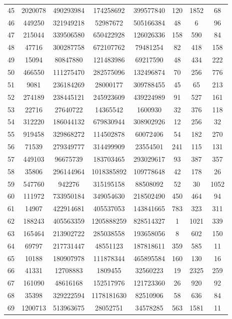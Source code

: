 \documentclass[11pt]{article}
\begin{document}
\begin{table}[h!]
\begin{tabular}{p{1cm}|C| C | C | C | C | C | C}
45 & 2020078 & 490293984 & 174258692 & 399577840 & 120 & 1852 & 68 \\ 
46 & 449250 & 321949218 & 52987672 & 505166384 & 48 & 6 & 96 \\ 
47 & 215044 & 339506580 & 650422928 & 126026336 & 158 & 590 & 84 \\ 
48 & 47716 & 300287758 & 672107762 & 79481254 & 82 & 418 & 158 \\ 
49 & 15094 & 80847880 & 121483986 & 69217590 & 48 & 434 & 222 \\ 
50 & 466550 & 111275470 & 282575096 & 132496874 & 70 & 256 & 776 \\ 
51 & 9081 & 236184269 & 28000177 & 309788455 & 45 & 65 & 213 \\ 
52 & 274189 & 238445121 & 245923609 & 439224989 & 91 & 527 & 161 \\ 
53 & 22716 & 27640722 & 14365542 & 1600930 & 32 & 376 & 118 \\ 
54 & 312220 & 186044132 & 679830944 & 308902926 & 12 & 256 & 32 \\ 
55 & 919458 & 329868272 & 114502878 & 60072406 & 54 & 182 & 270 \\ 
56 & 71539 & 279349777 & 314499909 & 23554501 & 241 & 115 & 131 \\ 
57 & 449103 & 96675739 & 183703465 & 293029617 & 93 & 387 & 357 \\ 
58 & 35806 & 296144964 & 1018385892 & 109778648 & 42 & 178 & 26 \\ 
59 & 547760 & 942276 & 315195158 & 88508092 & 52 & 30 & 1052 \\ 
60 & 111972 & 733950184 & 349054630 & 218502490 & 450 & 464 & 94 \\ 
61 & 14907 & 422914681 & 405537053 & 143841665 & 783 & 323 & 311 \\ 
62 & 188243 & 405563359 & 1205888259 & 828514327 & 1 & 1021 & 339 \\ 
63 & 165464 & 213902722 & 285038558 & 193658056 & 8 & 602 & 150 \\ 
64 & 69797 & 217731447 & 48551123 & 187818611 & 359 & 585 & 11 \\ 
65 & 10188 & 180907978 & 111878344 & 465895584 & 160 & 130 & 16 \\ 
66 & 41331 & 12708883 & 1809455 & 32560223 & 19 & 2325 & 259 \\ 
67 & 161090 & 48616168 & 152517976 & 121723360 & 26 & 920 & 92 \\ 
68 & 35398 & 329222594 & 1178181630 & 82510906 & 58 & 636 & 84 \\ 
69 & 1200713 & 513963675 & 28052751 & 34578285 & 563 & 1581 & 11 \\ 

\end{tabular}
\end{table}
\end{document}

